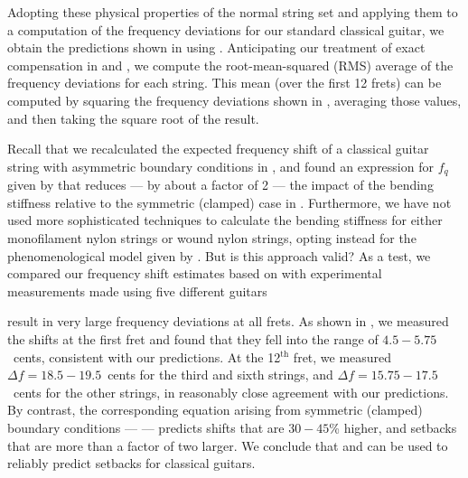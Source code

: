 Adopting these physical properties of the normal string set and applying them to a computation of the frequency deviations for our standard classical guitar, we obtain the predictions shown in  using . Anticipating our treatment of exact compensation in  and , we compute the root-mean-squared (RMS) average of the frequency deviations for each string. This mean (over the first 12 frets) can be computed by squaring the frequency deviations shown in , averaging those values, and then taking the square root of the result.

Recall that we recalculated the expected frequency shift of a classical guitar string with asymmetric boundary conditions in , and found an expression for $f_q$ given by  that reduces --- by about a factor of 2 --- the impact of the bending stiffness relative to the symmetric (clamped) case in . Furthermore, we have not used more sophisticated techniques to calculate the bending stiffness for either monofilament nylon strings or wound nylon strings, opting instead for the phenomenological model given by . But is this approach valid? As a test, we compared our frequency shift estimates based on  with experimental measurements made using five different guitars 

result in very large frequency deviations at all frets. As shown in , we measured the shifts at the first fret and found that they fell into the range of $4.5 - 5.75$~cents, consistent with our predictions. At the 12$^\mathrm{th}$ fret, we measured $\Delta f = 18.5 - 19.5$~cents for the third and sixth strings, and $\Delta f = 15.75 - 17.5$~cents for the other strings, in reasonably close agreement with our predictions. By contrast, the corresponding equation arising from symmetric (clamped) boundary conditions ---  --- predicts shifts that are $30 - 45$\% higher, and setbacks that are more than a factor of two larger. We conclude that  and  can be used to reliably predict setbacks for classical guitars.

